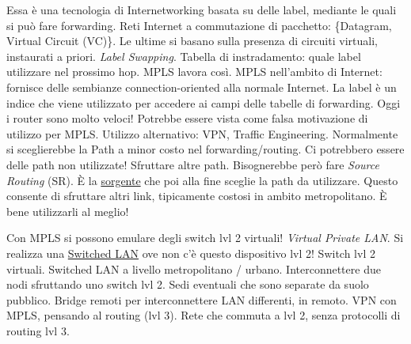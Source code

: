 Essa è una tecnologia di Internetworking basata su delle label, mediante le quali si può fare forwarding. Reti Internet a commutazione di pacchetto: \{Datagram, Virtual Circuit (VC)\}. Le ultime si basano sulla presenza di circuiti virtuali, instaurati a priori. \textit{Label Swapping}. Tabella di instradamento: quale label utilizzare nel prossimo hop. MPLS lavora così. MPLS nell'ambito di Internet: fornisce delle sembianze connection-oriented alla normale Internet. La label è un indice che viene utilizzato per accedere ai campi delle tabelle di forwarding. Oggi i router sono molto veloci! Potrebbe essere vista come falsa motivazione di utilizzo per MPLS. Utilizzo alternativo: VPN, Traffic Engineering. Normalmente si sceglierebbe la Path a minor costo nel forwarding/routing. Ci potrebbero essere delle path non utilizzate! Sfruttare altre path. Bisognerebbe però fare \textit{Source Routing} (SR). \`E la \underline{sorgente} che poi alla fine sceglie la path da utilizzare. Questo consente di sfruttare altri link, tipicamente costosi in ambito metropolitano. \`E bene utilizzarli al meglio!

Con MPLS si possono emulare degli switch lvl 2 virtuali! \textit{Virtual Private LAN}. Si realizza una \underline{Switched LAN} ove non c'è questo dispositivo lvl 2! Switch lvl 2 virtuali. Switched LAN a livello metropolitano / urbano. Interconnettere due nodi sfruttando uno switch lvl 2. Sedi eventuali che sono separate da suolo pubblico. Bridge remoti per interconnettere LAN differenti, in remoto. VPN con MPLS, pensando al routing (lvl 3). Rete che commuta a lvl 2, senza protocolli di routing lvl 3. 


